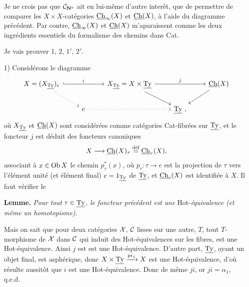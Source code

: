 Je ne crois pas que $\mathcal{C}_{\mathbf{N}^{o}}$ ait en lui-même d'autre interêt, que de permettre de comparer %
les $X \times X$-catégories $\underline{\mathrm{Ch}}_{\infty}(X)$ et $\underline{\mathrm{Ch}}(X)$, à l'aide du diagramme précédent. Par contre, $\underline{\mathrm{Ch}}_{\infty}(X)$ et $\underline{\mathrm{Ch}}(X)$ m'aparaissent comme les deux ingrédients essentiels du formalisme des %
chemins dans Cat.

Je vais prouver 1, 2, $1'$, $2'$.

1) Considérons le diagramme
\[
\begin{tikzcd}
X = (X_{\Ty})_e \ar[rr,hook,"i"] \ar[dr,dotted] & & X_{\Ty} = X \times \Ty \ar[rr,"j"] \ar[dr] & & \Ch(X) \ar[dl] \\
& e \ar[rr,dotted] & & \Ty\ , &
\end{tikzcd}
\]
où $X_{\underline{\mathrm{Ty}}}$ et $\underline{\mathrm{Ch}}(X)$ sont considérées comme catégories Cat-fibrées sur $\underline{\mathrm{Ty}}$, et le foncteur $j$ est déduit des foncteurs canoniques
\[
X \longrightarrow \underline{\mathrm{Ch}}(X)_{\tau} \overset{\text{déf}}{=} \underline{\mathrm{Ch}}_{\tau}(X),
\]
associant à $x \in \operatorname{Ob} X$ le chemin $p_{\tau}^{*}(x)$, où $p_{\tau} : \tau \longrightarrow e$ est la projection de $\tau$ vers l'élément unité (et élément final) $e = 1_{\underline{\mathrm{Ty}}}$ de $\underline{\mathrm{Ty}}$, et $\underline{\mathrm{Ch}}_{e}(X)$ est identifiée à $X$. Il faut vérifier le

\textbf{Lemme.} \textit{Pour tout $\tau \in \underline{\mathrm{Ty}}$, le foncteur précédent est une} Hot-\textit{équivalence (et même un homotopisme).}

Mais on sait que pour deux catégories $\mathcal{X}$, $\mathcal{C}$ lisses sur une autre, $T$, tout $T$-morphisme de $\mathcal{X}$ dans $\mathcal{C}$ qui induit des Hot-équivalences sur les fibres, est une Hot-équivalence. Ainsi $j$ est
est une Hot-équivalence. D'autre part, $\underline{\mathrm{Ty}}$, ayant un objet final, est asphérique, donc %
$X \times \underline{\mathrm{Ty}} \xrightarrow{\mathrm{pr}_1} X$ est une Hot-équivalence, d'où résulte aussitôt que $i$ est une Hot-équivalence. Donc de même $ji$, or $ji = \alpha_1$, q.e.d.

